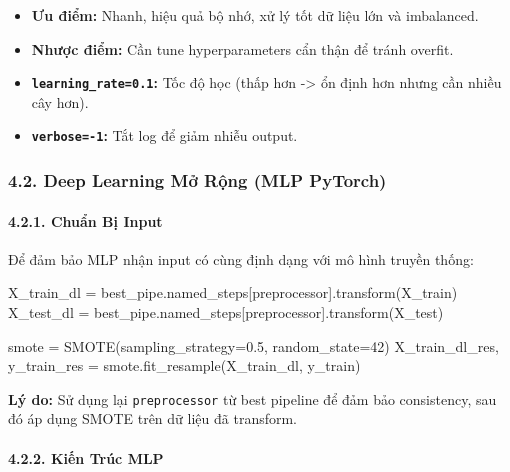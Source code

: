 \documentclass[
]{article}
\newenvironment{Shaded}{}{}
\newcommand{\DecValTok}[1]{\textcolor[rgb]{0.25,0.63,0.44}{#1}}
\newcommand{\FloatTok}[1]{\textcolor[rgb]{0.25,0.63,0.44}{#1}}
\newcommand{\NormalTok}[1]{#1}
\newcommand{\OperatorTok}[1]{\textcolor[rgb]{0.40,0.40,0.40}{#1}}
\newcommand{\StringTok}[1]{\textcolor[rgb]{0.25,0.44,0.63}{#1}}
\providecommand{\tightlist}{%
  \setlength{\itemsep}{0pt}\setlength{\parskip}{0pt}}
\begin{document}
\begin{itemize}
\tightlist
\item
  \textbf{Ưu điểm:} Nhanh, hiệu quả bộ nhớ, xử lý tốt dữ liệu lớn và
  imbalanced.
\item
  \textbf{Nhược điểm:} Cần tune hyperparameters cẩn thận để tránh
  overfit.
\item
  \textbf{\texttt{learning\_rate=0.1}:} Tốc độ học (thấp hơn
  -\textgreater{} ổn định hơn nhưng cần nhiều cây hơn).
\item
  \textbf{\texttt{verbose=-1}:} Tắt log để giảm nhiễu output.
\end{itemize}

\subsubsection{4.2. Deep Learning Mở Rộng (MLP
PyTorch)}\label{42-deep-learning-mux1edf-rux1ed9ng-mlp-pytorch}

\paragraph{4.2.1. Chuẩn Bị Input}\label{421-chuux1ea9n-bux1ecb-input}

Để đảm bảo MLP nhận input có cùng định dạng với mô hình truyền thống:

\begin{Shaded}
\begin{Highlighting}[]
\NormalTok{X\_train\_dl }\OperatorTok{=}\NormalTok{ best\_pipe.named\_steps[}\StringTok{\textquotesingle{}preprocessor\textquotesingle{}}\NormalTok{].transform(X\_train)}
\NormalTok{X\_test\_dl }\OperatorTok{=}\NormalTok{ best\_pipe.named\_steps[}\StringTok{\textquotesingle{}preprocessor\textquotesingle{}}\NormalTok{].transform(X\_test)}

\NormalTok{smote }\OperatorTok{=}\NormalTok{ SMOTE(sampling\_strategy}\OperatorTok{=}\FloatTok{0.5}\NormalTok{, random\_state}\OperatorTok{=}\DecValTok{42}\NormalTok{)}
\NormalTok{X\_train\_dl\_res, y\_train\_res }\OperatorTok{=}\NormalTok{ smote.fit\_resample(X\_train\_dl, y\_train)}
\end{Highlighting}
\end{Shaded}

\textbf{Lý do:} Sử dụng lại \texttt{preprocessor} từ best pipeline để
đảm bảo consistency, sau đó áp dụng SMOTE trên dữ liệu đã transform.

\paragraph{4.2.2. Kiến Trúc MLP}\label{422-kiux1ebfn-truxfac-mlp}
\end{document}
